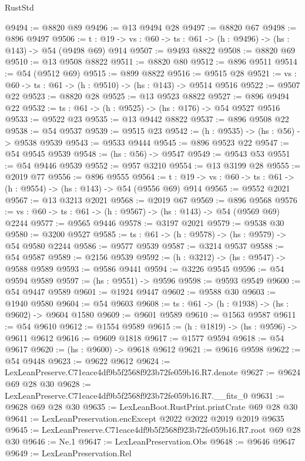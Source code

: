\begin{lexlean}{RustStd}
\begin{coremodule}
@9494 := @8820 @89
@9496 := @13 @9494 @28
@9497 := @8820 @67
@9498 := @896 @9497
@9506 := {t : @19} -> {vs : @60} -> {ts : @61} -> (h : @9496) -> (hs : @143) -> @54 (@9498 @69) @914
@9507 := @9493 @8822
@9508 := @8820 @69
@9510 := @13 @9508 @8822
@9511 := @8820 @80
@9512 := @896 @9511
@9514 := @54 (@9512 @69)
@9515 := @899 @8822
@9516 := @9515 @28
@9521 := {vs : @60} -> {ts : @61} -> (h : @9510) -> (hs : @143) -> @9514 @9516
@9522 := @9507 @22
@9523 := @8820 @28
@9525 := @13 @9523 @8822
@9527 := @896 @9494 @22
@9532 := {ts : @61} -> (h : @9525) -> (hs : @176) -> @54 @9527 @9516
@9533 := @9522 @23
@9535 := @13 @9442 @8822
@9537 := @896 @9508 @22
@9538 := @54 @9537
@9539 := @9515 @23
@9542 := (h : @9535) -> (hs : @56) -> @9538 @9539
@9543 := @9533 @9444
@9545 := @896 @9523 @22
@9547 := @54 @9545 @9539
@9548 := (hs : @56) -> @9547
@9549 := @9543 @53
@9551 := @54 @9446 @9539
@9552 := @957 @3210
@9554 := @13 @3199 @28
@9555 := @2019 @77
@9556 := @896 @9555
@9564 := {t : @19} -> {vs : @60} -> {ts : @61} -> (h : @9554) -> (hs : @143) -> @54 (@9556 @69) @914
@9565 := @9552 @2021
@9567 := @13 @3213 @2021
@9568 := @2019 @67
@9569 := @896 @9568
@9576 := {vs : @60} -> {ts : @61} -> (h : @9567) -> (hs : @143) -> @54 (@9569 @69) @2244
@9577 := @9565 @9446
@9578 := @3197 @2021
@9579 := @9538 @30
@9580 := @3200 @9527
@9585 := {ts : @61} -> (h : @9578) -> (hs : @9579) -> @54 @9580 @2244
@9586 := @9577 @9539
@9587 := @3214 @9537
@9588 := @54 @9587
@9589 := @2156 @9539
@9592 := (h : @3212) -> (hs : @9547) -> @9588 @9589
@9593 := @9586 @9441
@9594 := @3226 @9545
@9596 := @54 @9594 @9589
@9597 := (hs : @9551) -> @9596
@9598 := @9593 @9549
@9600 := @54 @9447 @9589
@9601 := @1924 @9447
@9602 := @9588 @30
@9603 := @1940 @9580
@9604 := @54 @9603
@9608 := {ts : @61} -> (h : @1938) -> (hs : @9602) -> @9604 @1580
@9609 := @9601 @9589
@9610 := @1563 @9587
@9611 := @54 @9610
@9612 := @1554 @9589
@9615 := (h : @1819) -> (hs : @9596) -> @9611 @9612
@9616 := @9609 @1818
@9617 := @1577 @9594
@9618 := @54 @9617
@9620 := (hs : @9600) -> @9618 @9612
@9621 := @9616 @9598
@9622 := @54 @9448
@9623 := @9622 @9612
@9624 := LexLeanPreserve.C71eace4df9b5f2568f923b72fe059b16.R7.denote
@9627 := @9624 @69 @28 @30
@9628 := LexLeanPreserve.C71eace4df9b5f2568f923b72fe059b16.R7.__fits_0
@9631 := @9628 @69 @28 @30
@9635 := LexLeanBoot.RustPrint.printCrate @69 @28 @30
@9641 := LexLeanPreservation.encExcept @2022 @2022 @2019 @2019 @9635
@9645 := LexLeanPreserve.C71eace4df9b5f2568f923b72fe059b16.R7.root @69 @28 @30
@9646 := Ne.{1}
@9647 := LexLeanPreservation.Obs
@9648 := @9646 @9647
@9649 := LexLeanPreservation.Rel

\end{coremodule}
\end{lexlean}
